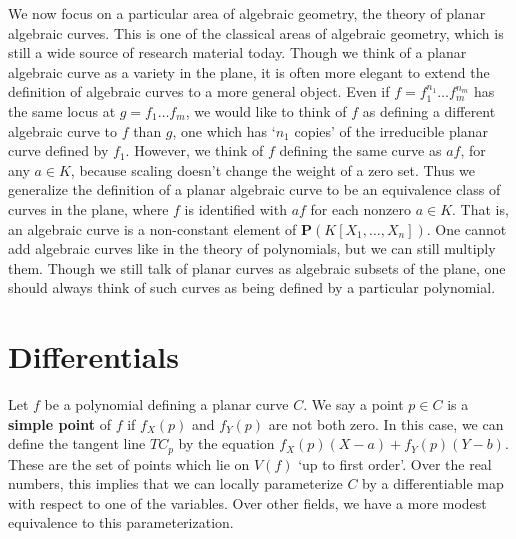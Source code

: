 We now focus on a particular area of algebraic geometry, the theory of planar algebraic curves. This is one of the classical areas of algebraic geometry, which is still a wide source of research material today. Though we think of a planar algebraic curve as a variety in the plane, it is often more elegant to extend the definition of algebraic curves to a more general object. Even if $f = f_1^{n_1} \dots f_m^{n_m}$ has the same locus at $g = f_1 \dots f_m$, we would like to think of $f$ as defining a different algebraic curve to $f$ than $g$, one which has `$n_1$ copies' of the irreducible planar curve defined by $f_1$. However, we think of $f$ defining the same curve as $af$, for any $a \in K$, because scaling doesn't change the weight of a zero set. Thus we generalize the definition of a planar algebraic curve to be an equivalence class of curves in the plane, where $f$ is identified with $af$ for each nonzero $a \in K$. That is, an algebraic curve is a non-constant element of $\mathbf{P}(K[X_1, \dots, X_n])$. One cannot add algebraic curves like in the theory of polynomials, but we can still multiply them. Though we still talk of planar curves as algebraic subsets of the plane, one should always think of such curves as being defined by a particular polynomial.

\section{Differentials}

Let $f$ be a polynomial defining a planar curve $C$. We say a point $p \in C$ is a {\bf simple point} of $f$ if $f_X(p)$ and $f_Y(p)$ are not both zero. In this case, we can define the tangent line $TC_p$ by the equation $f_X(p) (X - a) + f_Y(p) (Y - b)$. These are the set of points which lie on $V(f)$ `up to first order'. Over the real numbers, this implies that we can locally parameterize $C$ by a differentiable map with respect to one of the variables. Over other fields, we have a more modest equivalence to this parameterization.

